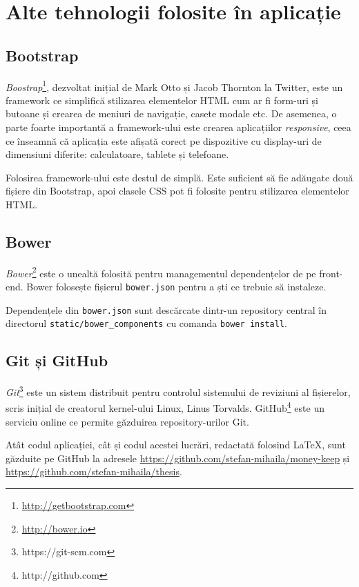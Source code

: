 \chapter{Alte tehnologii folosite în aplicație}

\section{Bootstrap}

\emph{Boostrap}\footnote{\url{http://getbootstrap.com}}, 
dezvoltat inițial de Mark Otto 
și Jacob Thornton la Twitter, este un framework ce simplifică stilizarea
elementelor HTML cum ar fi form-uri și butoane și crearea
de meniuri de navigație, casete modale etc. De asemenea,
o parte foarte importantă a framework-ului este crearea aplicațiilor
\emph{responsive}, ceea ce înseamnă că aplicația este afișată
corect pe dispozitive cu display-uri de dimensiuni diferite:
calculatoare, tablete și telefoane.

Folosirea framework-ului este destul de simplă. Este
suficient să fie adăugate două fișiere din Bootstrap,
apoi clasele CSS pot fi folosite pentru stilizarea
elementelor HTML.


\section{Bower}

\emph{Bower}\footnote{\url{http://bower.io}} este o unealtă
folosită pentru managementul dependențelor de pe front-end.
Bower folosește fișierul \texttt{bower.json} pentru a 
ști ce trebuie să instaleze.



Dependențele din \texttt{bower.json} sunt descărcate dintr-un
repository central în directorul \texttt{static/bower\_components}
cu comanda \texttt{bower install}.

\section{Git și GitHub}

\emph{Git}\footnote{https://git-scm.com} este un sistem distribuit
pentru controlul sistemului de reviziuni al fișierelor,
scris inițial de creatorul kernel-ului Linux, Linus Torvalds.
GitHub\footnote{http://github.com} este un serviciu
online ce permite găzduirea repository-urilor Git.

Atât codul aplicației, cât și codul acestei lucrări, redactată folosind \LaTeX{},
sunt găzduite pe GitHub la adresele \url{https://github.com/stefan-mihaila/money-keep}
și \url{https://github.com/stefan-mihaila/thesis}.

